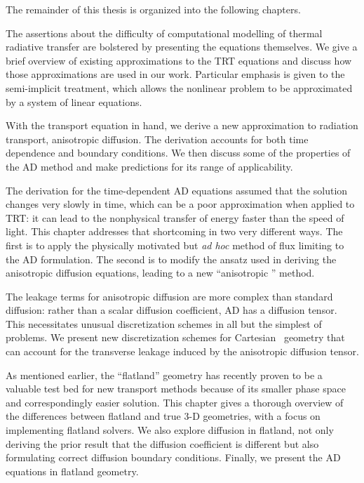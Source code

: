 The remainder of this thesis is organized into the following chapters.

The assertions about the difficulty of computational modelling of thermal
radiative transfer are bolstered by presenting the equations themselves. We give
a brief overview of existing approximations to the TRT equations and discuss how
those approximations are used in our work. Particular emphasis is given to the
semi-implicit treatment, which allows the nonlinear problem to be approximated
by a system of linear equations.

With the transport equation in hand, we derive a new approximation to radiation
transport, anisotropic diffusion. The derivation accounts for both time
dependence and boundary conditions. We then discuss some of the properties of
the AD method and make predictions for its range of applicability.

The derivation for the time-dependent AD equations assumed that the solution
changes very slowly in time, which can be a poor approximation when applied to
TRT: it can lead to the nonphysical transfer of energy faster than the speed of
light. This chapter addresses that shortcoming in two very different ways. The
first is to apply the physically motivated but \emph{ad hoc} method of flux
limiting to the AD formulation. The second is to modify the ansatz used in
deriving the anisotropic diffusion equations, leading to a new ``anisotropic
\Pone'' method.

The leakage terms for anisotropic diffusion are more complex than standard
diffusion: rather than a scalar diffusion coefficient, AD has a diffusion
tensor. This necessitates unusual discretization schemes in all but the simplest
of problems. We present new discretization schemes for Cartesian \xy\ geometry
that can account for the transverse leakage induced by the anisotropic diffusion
tensor.

As mentioned earlier, the ``flatland'' geometry has recently proven to be a
valuable test bed for new transport methods because of its smaller phase space
and correspondingly easier solution. This chapter gives a thorough overview of
the differences between flatland and true 3-D geometries, with a focus on
implementing flatland solvers. We also explore diffusion in flatland, not only
deriving the prior result that the diffusion coefficient is different but also
formulating correct diffusion boundary conditions. Finally, we present the AD
equations in flatland geometry.

